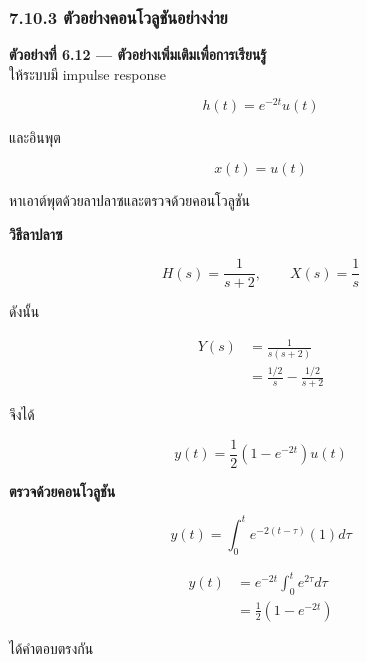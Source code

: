 \subsubsection{7.10.3 ตัวอย่างคอนโวลูชันอย่างง่าย}

\textbf{ตัวอย่างที่ 6.12 — ตัวอย่างเพิ่มเติมเพื่อการเรียนรู้}\\
ให้ระบบมี impulse response

\[
h(t)=e^{-2t}u(t)
\]

และอินพุต

\[
x(t)=u(t)
\]

หาเอาต์พุตด้วยลาปลาซและตรวจด้วยคอนโวลูชัน

\textbf{วิธีลาปลาซ}

\[
H(s)=\frac{1}{s+2},\qquad X(s)=\frac{1}{s}
\]

ดังนั้น

\[
\begin{aligned}
    Y(s)&=\frac{1}{s(s+2)}\\
    &=\frac{1/2}{s}-\frac{1/2}{s+2}
\end{aligned}
\]

จึงได้

\[
\boxed{y(t)=\frac{1}{2}\left(1-e^{-2t}\right)u(t)}
\]

\textbf{ตรวจด้วยคอนโวลูชัน}

\[
y(t)=\int_0^t e^{-2(t-\tau)}(1)d\tau
\]

\[
\begin{aligned}
    y(t)&=e^{-2t}\int_0^t e^{2\tau}d\tau\\
    &=\frac{1}{2}(1-e^{-2t})
\end{aligned}
\]

ได้คำตอบตรงกัน


